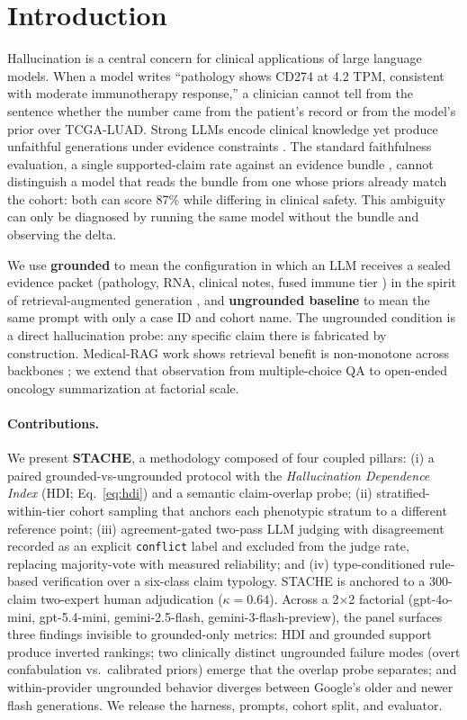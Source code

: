 \documentclass{article}
\theoremstyle{plain}
\begin{document}
\section{Introduction}
\label{sec:intro}

Hallucination is a central concern for clinical applications of large language models. When a model writes ``pathology shows CD274 at 4.2 TPM, consistent with moderate immunotherapy response,'' a clinician cannot tell from the sentence whether the number came from the patient's record or from the model's prior over TCGA-LUAD. Strong LLMs encode clinical knowledge \citep{singhal2023largelanguagemodelsencode} yet produce unfaithful generations under evidence constraints \citep{ji2023survey,maynez2020faithfulness,pal2023medhalt}. The standard faithfulness evaluation, a single supported-claim rate against an evidence bundle \citep{deyoung2021ms2,tsatsaronis2015bioasq}, cannot distinguish a model that reads the bundle from one whose priors already match the cohort: both can score 87\% while differing in clinical safety. This ambiguity can only be diagnosed by running the same model without the bundle and observing the delta.

We use \textbf{grounded} to mean the configuration in which an LLM receives a sealed evidence packet (pathology, RNA, clinical notes, fused immune tier \citep{thorsson2018immune}) in the spirit of retrieval-augmented generation \citep{lewis2020rag,shuster2021retrieval}, and \textbf{ungrounded baseline} to mean the same prompt with only a case ID and cohort name. The ungrounded condition is a direct hallucination probe: any specific claim there is fabricated by construction. Medical-RAG work shows retrieval benefit is non-monotone across backbones \citep{xiong2024benchmarking}; we extend that observation from multiple-choice QA to open-ended oncology summarization at factorial scale.

\paragraph{Contributions.} We present \textbf{STACHE}, a methodology composed of four coupled pillars: (i) a paired grounded-vs-ungrounded protocol with the \emph{Hallucination Dependence Index} (HDI; Eq.~\ref{eq:hdi}) and a semantic claim-overlap probe; (ii) stratified-within-tier cohort sampling that anchors each phenotypic stratum to a different reference point; (iii) agreement-gated two-pass LLM judging with disagreement recorded as an explicit \texttt{conflict} label and excluded from the judge rate, replacing majority-vote with measured reliability; and (iv) type-conditioned rule-based verification over a six-class claim typology. STACHE is anchored to a 300-claim two-expert human adjudication ($\kappa{=}0.64$). Across a 2$\times$2 factorial (gpt-4o-mini, gpt-5.4-mini, gemini-2.5-flash, gemini-3-flash-preview), the panel surfaces three findings invisible to grounded-only metrics: HDI and grounded support produce inverted rankings; two clinically distinct ungrounded failure modes (overt confabulation vs.\ calibrated priors) emerge that the overlap probe separates; and within-provider ungrounded behavior diverges between Google's older and newer flash generations. We release the harness, prompts, cohort split, and evaluator.
\end{document}
